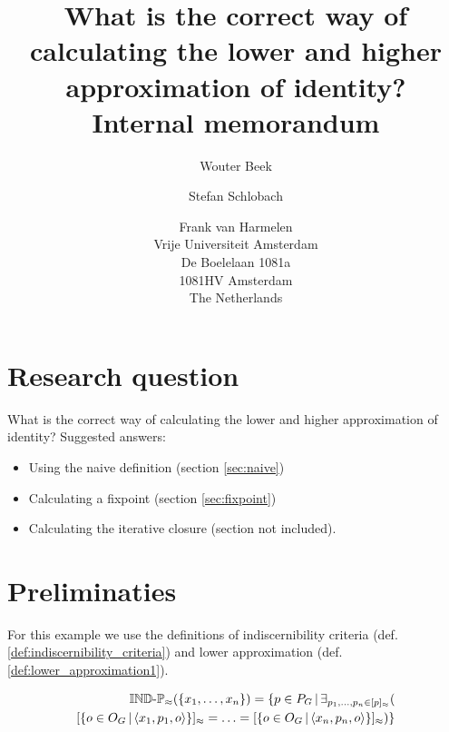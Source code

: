 \documentclass[a4paper]{article}
\begin{document}
\title{
  What is the correct way of calculating
  the lower and higher approximation of identity?\\
  Internal memorandum
}
\author{Wouter Beek \and Stefan Schlobach \and Frank van Harmelen\\
Vrije Universiteit Amsterdam\\
De Boelelaan 1081a\\
1081HV Amsterdam\\
The Netherlands}
\maketitle

\section{Research question}

What is the correct way of calculating
  the lower and higher approximation of identity?
Suggested answers:
  \begin{itemize}
    \item Using the naive definition (section \ref{sec:naive})
    \item Calculating a fixpoint (section \ref{sec:fixpoint})
    \item Calculating the iterative closure (section not included).
  \end{itemize}

\section{Preliminaties}
\label{sec:preliminaries}

For this example we use the definitions of
  indiscernibility criteria (def. \ref{def:indiscernibility_criteria})
  and lower approximation (def. \ref{def:lower_approximation1}).

\begin{definition}
\label{def:indiscernibility_criteria}
\begin{align}
  \indp_{\approx}(\setrange{x_1}{x_n})
=
  \setdef{
    p \in P_G
  }{
    \exists_{\range{p_1}{p_n} \in \equivset{p}}(\\
        \equivset{
          \setdef{
            o \in O_G
          }{
            \triple{x_1}{p_1}{o}
          }
        }
      =
        \ldots
      =
        \equivset{
          \setdef{
            o \in O_G
          }{
            \triple{x_n}{p_n}{o}
          }
        }
    )
  }\nonumber
\end{align}
\end{definition}
\end{document}
